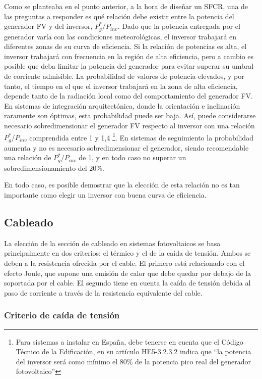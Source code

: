 Como se planteaba en el punto anterior, a la hora de diseñar un SFCR,
una de las preguntas a responder es qué relación debe existir entre
la potencia del generador FV y del inversor, $P_{g}^{*}/P_{inv}$.
Dado que la potencia entregada por el generador varía con las condiciones
meteorológicas, el inversor trabajará en diferentes zonas de su curva
de eficiencia. Si la relación de potencias es alta, el inversor trabajará
con frecuencia en la región de alta eficiencia, pero a cambio es posible
que deba limitar la potencia del generador para evitar superar su
umbral de corriente admisible. La probabilidad de valores de potencia
elevados, y por tanto, el tiempo en el que el inversor trabajará en
la zona de alta eficiencia, depende tanto de la radiación local como
del comportamiento del generador FV. En sistemas de integración arquitectónica,
donde la orientación e inclinación raramente son óptimas, esta probabilidad
puede ser baja. Así, puede considerarse necesario sobredimensionar
el generador FV respecto al inversor con una relación $P_{g}^{*}/P_{inv}$
comprendida entre 1 y 1,4%
\footnote{Para sistemas a instalar en España, debe tenerse en cuenta que el
Código Técnico de la Edificación, en su artículo HE5-3.2.3.2 indica
que {}``la potencia del inversor será como mínimo el 80\% de la potencia
pico real del generador fotovoltaico''%
}. En sistemas de seguimiento la probabilidad aumenta y no es necesario
sobredimensionar el generador, siendo recomendable una relación de
$P_{g}^{*}/P_{inv}$ de 1, y en todo caso no superar un sobredimensionamiento
del 20\%.

En todo caso, es posible demostrar \cite{Lorenzo2005} que la elección
de esta relación no es tan importante como elegir un inversor con
buena curva de eficiencia. 

\subsection{Cableado}

La elección de la sección de cableado en sistemas fotovoltaicos se
basa principalmente en dos criterios: el térmico y el de la caída de
tensión. Ambos se deben a la resistencia ofrecida por el cable.  El
primero está relacionado con el efecto Joule, que supone una emisión
de calor que debe quedar por debajo de la soportada por el cable.  El
segundo tiene en cuenta la caída de tensión debida al paso de
corriente a través de la resistencia equivalente del cable.

\subsubsection{Criterio de caída de tensión}
\label{sec:criterio-caida-tension}

